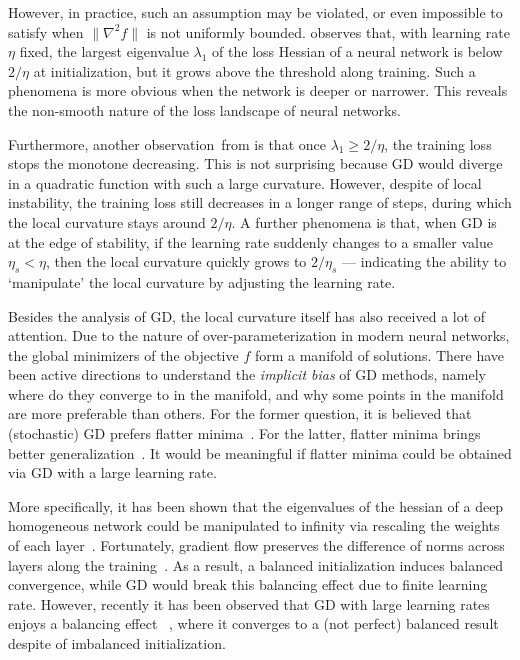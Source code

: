\documentclass{article}
\newcommand{\citet}[1]{\cite{#1}}
\newcommand{\citep}[1]{\cite{#1}}
\theoremstyle{plain}
\theoremstyle{remark}
\begin{document}
However, in practice, such an assumption may be violated, or even impossible to satisfy when $\| \nabla^2 f \|$ is not uniformly bounded. \citet{cohen2020gradient} observes that, with learning rate $\eta$ fixed, the largest eigenvalue $\lambda_1$ of the loss Hessian of a neural network is below $2/\eta$ at initialization, but it grows above the threshold along training. Such a phenomena is more obvious when the network is deeper or narrower. This reveals the non-smooth nature of the loss landscape of neural networks.

Furthermore, another observation~from \citet{cohen2020gradient} is that once $\lambda_1\ge 2/\eta$, the training loss stops the monotone decreasing. This is not surprising because GD would diverge in a quadratic function with such a large curvature. However, despite of local instability, the training loss still decreases in a longer range of steps, during which the local curvature stays around $2/\eta$. A further phenomena is that, when GD is at the edge of stability, if the learning rate suddenly changes to a smaller value $\eta_s<\eta$, then the local curvature quickly grows to $2/\eta_s$ --- indicating the ability to `manipulate' the local curvature by adjusting the learning rate.

Besides the analysis of GD, the local curvature itself has also received a lot of attention. Due to the nature of over-parameterization in modern neural networks, the global minimizers of the objective $f$ form a manifold of solutions. There have been active directions to understand the \emph{implicit bias} of GD methods, namely where do they converge to in the manifold, and why some points in the manifold are more preferable than others. For the former question, it is believed that (stochastic) GD prefers flatter minima~\citep{barrett2020implicit, smith2021origin, damian2021label, ma2021sobolev}. For the latter, flatter minima brings better generalization~\citep{hochreiter1997flat,li2018visualizing,keskar2016large,ma2021sobolev,ding2022flat}. It would be meaningful if flatter minima could be obtained via GD with a large learning rate.

More specifically, it has been shown that the eigenvalues of the hessian of a deep homogeneous network could be manipulated to infinity via rescaling the weights of each layer~\citep{elkabetz2021continuous}. Fortunately, gradient flow preserves the difference of norms across layers along the training~\citep{du2018algorithmic}. As a result, a balanced initialization induces balanced convergence, while GD would break this balancing effect due to finite learning rate. However, recently it has been observed that GD with large learning rates enjoys a balancing effect ~\citep{wang2021large}, where it converges to a (not perfect) balanced result despite of imbalanced initialization.
\end{document}
